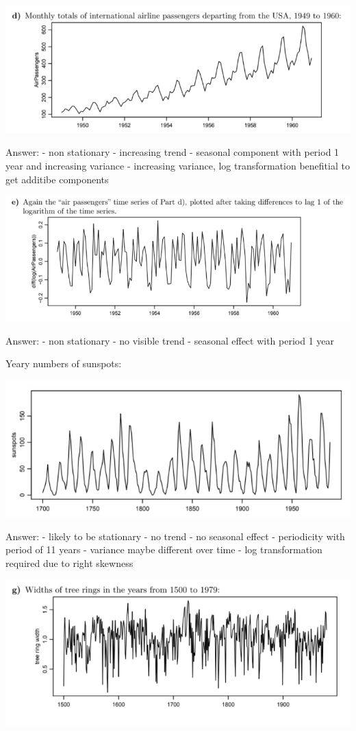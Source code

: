 \documentclass[
]{article}
\begin{document}
\includegraphics[width=1\linewidth]{Ex1.3d}

Answer: - non stationary - increasing trend - seasonal component with
period 1 year and increasing variance - increasing variance, log
transformation benefitial to get additibe components

\includegraphics[width=1\linewidth]{Ex1.3e}

Answer: - non stationary - no visible trend - seasonal effect with
period 1 year

Yeary numbers of sunspots:

\includegraphics[width=1\linewidth]{Ex1.3f}

Answer: - likely to be stationary - no trend - no seasonal effect -
periodicity with period of 11 years - variance maybe different over time
- log transformation required due to right skewness

\includegraphics[width=1\linewidth]{Ex1.3g}
\end{document}
